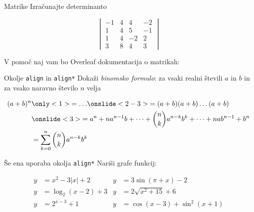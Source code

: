 \begin{frame}{Matrike}
	Izračunajte determinanto

		
		$$\begin{vmatrix}
			
			 -1 & 4 & 4 & -2 \\
			 1 & 4 & 5 & -1 \\
			 1 & 4 & -2 & 2 \\
			 3 & 8 & 4 & 3 
	
		\end{vmatrix}$$
	
	V pomoč naj vam bo Overleaf dokumentacija o matrikah:
	
	\href{https://www.overleaf.com/learn/latex/Matrices}{}
\end{frame}

\begin{frame}{Okolje \texttt{align} in \texttt{align*}}
	Dokaži \emph{binomsko formulo}: za vsaki realni števili $a$ in $b$ in za vsako naravno število $n$ velja
	
	\begin{align*}
		(a + b)^n &\only<1>{= \ldots} 
		\onslide<2-3>{= (a + b)(a + b) \dots (a + b)} \\
		 &\onslide<3>{= a^n + n a^{n-1} b + \dots + \binom{n}{k} a^{n-k} b^k + \dots + n a b^{n-1} + b^n} \\
		 &= \sum_{k=0}^n \binom{n}{k} a^{n-k} b^k
	\end{align*}
\end{frame}

\begin{frame}{Še ena uporaba okolja \texttt{align*}}
	Nariši grafe funkcij:
	
	
	\begin{align*}
		y &= x^2 - 3|x| + 2   &  y &= 3 \sin(\pi+x) - 2 \\
		y &= \log_2(x-2) + 3  &  y &= 2 \sqrt{x^2+15} + 6 \\
		y &= 2^{x-3} + 1      &  y &= \cos(x-3) + \sin^2(x+1) \\ 	
	\end{align*}
\end{frame}

